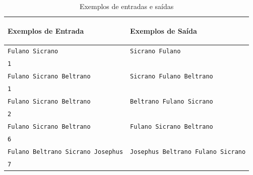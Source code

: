 {\begin{table}[!htbp]
    \centering
    \begin{tabular}{|p{8cm}|p{7cm}|}
        \hline
        \begin{center}
            \vspace{-0.3cm}
            \textbf{Exemplos de Entrada}
            \vspace{-0.3cm}
        \end{center} 
         &  
        \begin{center}
            \vspace{-0.3cm}
            \textbf{Exemplos de Saída}
            \vspace{-0.3cm}
        \end{center} \\ \hline
         \texttt{Fulano Sicrano} & \texttt{Sicrano Fulano} \\  
         \texttt{1} & \texttt{} \\  
         \hline
         \texttt{Fulano Sicrano Beltrano} & \texttt{Sicrano Fulano Beltrano} \\  
         \texttt{1} & \texttt{} \\  
         \hline    
         \texttt{Fulano Sicrano Beltrano} & \texttt{Beltrano Fulano Sicrano} \\  
         \texttt{2} & \texttt{} \\  
         \hline
         \texttt{Fulano Sicrano Beltrano} & \texttt{Fulano Sicrano Beltrano} \\  
         \texttt{6} & \texttt{} \\  
         \hline
         \texttt{Fulano Beltrano Sicrano Josephus} & \texttt{Josephus Beltrano Fulano Sicrano} \\  
         \texttt{7} & \texttt{} \\  
         \hline 
    \end{tabular}
    \caption{Exemplos de entradas e saídas}
    \label{tab:inputHProblem24}
\end{table}}

\newpage

\begin{center}
\noindent

\end{center}